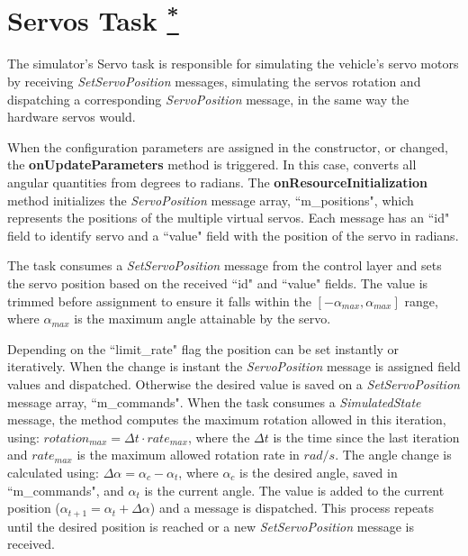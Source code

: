 \documentclass[10pt,a4paper]{article}
\begin{document}
\section{Servos Task \href{https://www.lsts.pt/docs/dune/dune-2017.01.0-dmsmw/df/d90/structSimulators_1_1Servos_1_1Task.html}{\textsuperscript{*}}}
\label{servos_task}

\par The simulator's Servo task is responsible for simulating the vehicle's servo motors by receiving \textit{SetServoPosition} messages, simulating the servos rotation and dispatching a corresponding \textit{ServoPosition} message, in the same way the hardware servos would.

\par When the configuration parameters are assigned in the constructor, or changed, the \textbf{onUpdateParameters} method is triggered. In this case, converts all angular quantities from degrees to radians. The \textbf{onResourceInitialization} method initializes the \textit{ServoPosition} message array, ``m\_positions", which represents the positions of the multiple virtual servos. Each message has an ``id" field to identify servo and a ``value" field with the position of the servo in radians.

\par The task consumes a \textit{SetServoPosition} message from the control layer and sets the servo position based on the received ``id" and ``value" fields. The value is trimmed before assignment to ensure it falls within the $\left[-\alpha_{max}, \alpha_{max}\right]$ range, where $\alpha_{max}$ is the maximum angle attainable by the servo.

\par Depending on the ``limit\_rate" flag the position can be set instantly or iteratively. When the change is instant the \textit{ServoPosition} message is assigned field values and dispatched. Otherwise the desired value is saved on a \textit{SetServoPosition} message array, ``m\_commands". When the task
consumes a \textit{SimulatedState} message, the method computes the maximum rotation allowed in this iteration, using: $rotation_{max} = \Delta t \cdot rate_{max}$, where the $\Delta t$ is the time since the last iteration and $rate_{max}$ is the maximum allowed rotation rate in $rad/s$. The angle change is calculated using: $\Delta \alpha = \alpha_{c} - \alpha_t$, where $\alpha_{c}$ is the desired angle, saved in ``m\_commands", and $\alpha_t$ is the current angle. The value is added to the current position ($\alpha_{t+1} = \alpha_t + \Delta \alpha$) and a message is dispatched. This process repeats until the desired position is reached or a new \textit{SetServoPosition} message is received.
\end{document}
